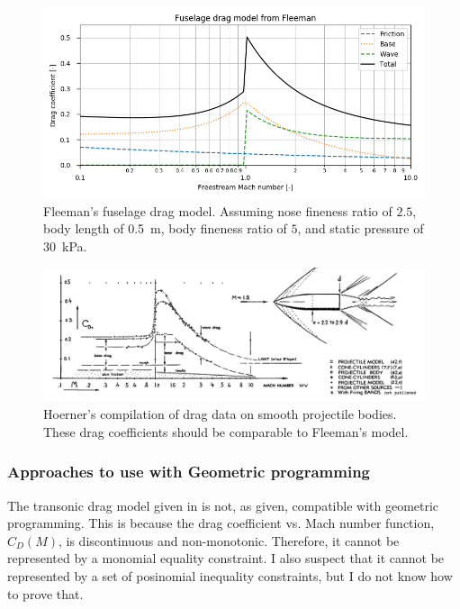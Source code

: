 \documentclass[12pt]{article}
\begin{document}
\begin{figure}[hbt!]
    \centering
    \includegraphics[width=1\textwidth]{figures/fleeman_fuselage_drag_model}
    \caption{\label{fig:fleeman_fuselage_drag_model} Fleeman's fuselage drag model. Assuming nose fineness ratio of $2.5$, body length of \SI{0.5}{\meter}, body fineness ratio of $5$, and static pressure of \SI{30}{\kilo\pascal}.}
\end{figure}

\begin{figure}[hbt!]
    \centering
    \includegraphics[width=1\textwidth]{figures/hoerner_fig_16_30}
    \caption{\label{fig:hoerner_fig_16_30} Hoerner's compilation of drag data on smooth projectile bodies. These drag coefficients should be comparable to Fleeman's model.}
\end{figure}


\subsubsection{Approaches to use with Geometric programming}
The transonic drag model given in \cite{Fleeman2012} is not, as given, compatible with geometric programming. This is because the drag coefficient vs. Mach number function, $C_D(M)$, is discontinuous and non-monotonic. Therefore, it cannot be represented by a monomial equality constraint. I also suspect that it cannot be represented by a set of posinomial inequality constraints, but I do not know how to prove that.
\end{document}
